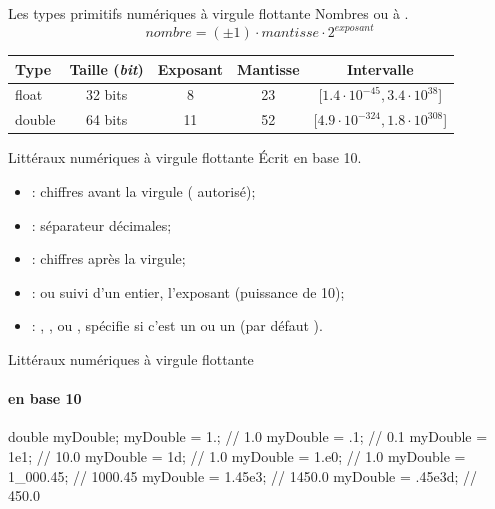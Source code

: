 \begin{hideedit}
\begin{frame}{Les types primitifs numériques à virgule flottante}
  Nombres  ou à .
  \[nombre = (\pm 1) \cdot mantisse \cdot 2^{exposant}\]
  \begin{center}
  \begin{tabular}[t]{|l|c|c|c|c|}
    \hline
    \rowcolor{black!40}
    \textbf{Type}   & \textbf{Taille (\textit{bit})}  
    & \textbf{Exposant} & \textbf{Mantisse} & \textbf{Intervalle}\\
    \hline
    float  & 32 bits          & 8    & 23 &
    [\(1.4 \cdot 10^{-45}, 3.4 \cdot 10^{38}\)]\\
    \hline
    double  & 64 bits          & 11  & 52 &
    [\(4.9 \cdot 10^{-324}, 1.8 \cdot 10^{308}\)]\\
    \hline
  \end{tabular}
  \end{center}
\end{frame}

\begin{frame}{Littéraux numériques à virgule flottante}
  Écrit en base 10.
  \begin{center}
    \bf {}
  \end{center}
  \begin{itemize}
    \item {} : chiffres avant la virgule (\pc{\_} autorisé);
    \item {} : séparateur décimales;
    \item {} : chiffres après la virgule;
    \item {} :  ou  suivi d'un entier,
      l'exposant (puissance de 10);
    \item {} : , ,  ou , spécifie si c'est un
       ou un  (par défaut ).
  \end{itemize}
\end{frame}

\begin{frame}[fragile]{Littéraux numériques à virgule flottante}
  \framesubtitle{en base 10}
\begin{java}
double myDouble;
myDouble = 1.;       // 1.0
myDouble = .1;       // 0.1
myDouble = 1e1;      // 10.0
myDouble = 1d;       // 1.0
myDouble = 1.e0;     // 1.0
myDouble = 1_000.45; // 1000.45
myDouble = 1.45e3;   // 1450.0
myDouble = .45e3d;   // 450.0


\end{java}
\end{frame}
\end{hideedit}
